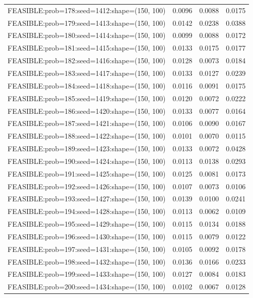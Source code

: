 \begin{longtable}{lccc}
FEASIBLE:prob=178:seed=1412:shape=(150, 100) &   0.0096 & 0.0088 & 0.0175 \\
FEASIBLE:prob=179:seed=1413:shape=(150, 100) &   0.0142 & 0.0238 & 0.0388 \\
FEASIBLE:prob=180:seed=1414:shape=(150, 100) &   0.0099 & 0.0088 & 0.0172 \\
FEASIBLE:prob=181:seed=1415:shape=(150, 100) &   0.0133 & 0.0175 & 0.0177 \\
FEASIBLE:prob=182:seed=1416:shape=(150, 100) &   0.0128 & 0.0073 & 0.0184 \\
FEASIBLE:prob=183:seed=1417:shape=(150, 100) &   0.0133 & 0.0127 & 0.0239 \\
FEASIBLE:prob=184:seed=1418:shape=(150, 100) &   0.0116 & 0.0091 & 0.0175 \\
FEASIBLE:prob=185:seed=1419:shape=(150, 100) &   0.0120 & 0.0072 & 0.0222 \\
FEASIBLE:prob=186:seed=1420:shape=(150, 100) &   0.0133 & 0.0077 & 0.0164 \\
FEASIBLE:prob=187:seed=1421:shape=(150, 100) &   0.0106 & 0.0090 & 0.0167 \\
FEASIBLE:prob=188:seed=1422:shape=(150, 100) &   0.0101 & 0.0070 & 0.0115 \\
FEASIBLE:prob=189:seed=1423:shape=(150, 100) &   0.0133 & 0.0072 & 0.0428 \\
FEASIBLE:prob=190:seed=1424:shape=(150, 100) &   0.0113 & 0.0138 & 0.0293 \\
FEASIBLE:prob=191:seed=1425:shape=(150, 100) &   0.0125 & 0.0081 & 0.0173 \\
FEASIBLE:prob=192:seed=1426:shape=(150, 100) &   0.0107 & 0.0073 & 0.0106 \\
FEASIBLE:prob=193:seed=1427:shape=(150, 100) &   0.0139 & 0.0100 & 0.0241 \\
FEASIBLE:prob=194:seed=1428:shape=(150, 100) &   0.0113 & 0.0062 & 0.0109 \\
FEASIBLE:prob=195:seed=1429:shape=(150, 100) &   0.0115 & 0.0134 & 0.0188 \\
FEASIBLE:prob=196:seed=1430:shape=(150, 100) &   0.0115 & 0.0079 & 0.0122 \\
FEASIBLE:prob=197:seed=1431:shape=(150, 100) &   0.0105 & 0.0092 & 0.0178 \\
FEASIBLE:prob=198:seed=1432:shape=(150, 100) &   0.0136 & 0.0166 & 0.0233 \\
FEASIBLE:prob=199:seed=1433:shape=(150, 100) &   0.0127 & 0.0084 & 0.0183 \\
FEASIBLE:prob=200:seed=1434:shape=(150, 100) &   0.0102 & 0.0067 & 0.0128 \\

\end{longtable}
